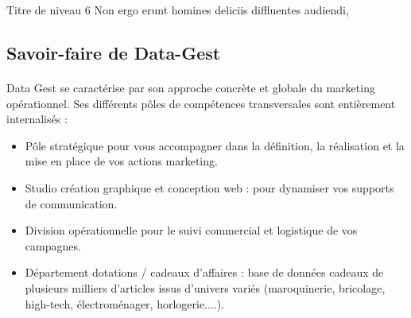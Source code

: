 Titre de niveau 6
Non ergo erunt homines deliciis diffluentes audiendi,

\subsection{Savoir-faire de Data-Gest}
\paragraph{}
Data Gest se caractérise par son approche concrète et globale du marketing opérationnel.
Ses différents pôles de compétences transversales sont entièrement internalisés :\\[1em]
\begin{itemize}
  \item Pôle stratégique pour vous accompagner dans la définition, la réalisation et la mise en place de vos actions marketing.
  \item Studio création graphique et conception web : pour dynamiser vos supports de communication.
  \item Division opérationnelle pour le suivi commercial et logistique de vos campagnes.
  \item Département dotations / cadeaux d’affaires : base de données cadeaux de plusieurs milliers d'articles issus d'univers variés (maroquinerie, bricolage, high-tech, électroménager, horlogerie....).

\end{itemize}

